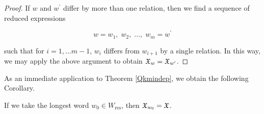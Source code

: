 \documentclass[a4 paper, 10pt]{article}
\begin{document}
\begin{proof}
If $w$ and $w^\prime$ differ by more than one relation, then we find a sequence of reduced expressions  

\begin{equation*}
 w = w_1,\; w_2,\; \dots,\; w_m = w^{\prime}
\end{equation*}

\noindent such that for $i = 1, \dots m-1$, $w_i$ differs from $w_{i+1}$ by a single relation. In this way, we may apply the above argument to obtain $\mathfrak{X}_w = \mathfrak{X}_{w^\prime}$.
\end{proof}


\noindent As an immediate application to Theorem \ref{Qkmindep}, we obtain the following Corollary.


\begin{corollary} \label{Qkm}
If we take the longest word $w_0 \in W_{\text{res}}$, then $\mathfrak{X}_{w_0} = \mathfrak{X}$.
\end{corollary}
\end{document}

